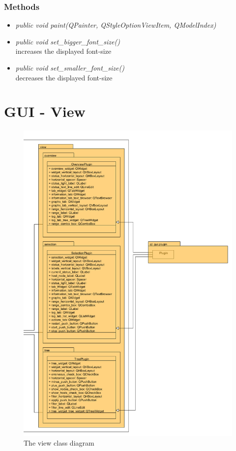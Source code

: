 \subsubsection{Methods}
\begin{itemize}
  \item \textit{public void paint(QPainter, QStyleOptionViewItem,
  QModelIndex)}\\
  
  \item \textit{public void set\_bigger\_font\_size()}\\
  increases the displayed font-size
  \item \textit{public void set\_smaller\_font\_size()}\\
  decreases the displayed font-size
\end{itemize}

\newpage
\section{GUI - View}
\begin{figure}[!ht]
\begin{center}
\includegraphics[width=0.8\linewidth]{./bilder/view.png}
\caption{The view class diagram}
\end{center}
\end{figure}

